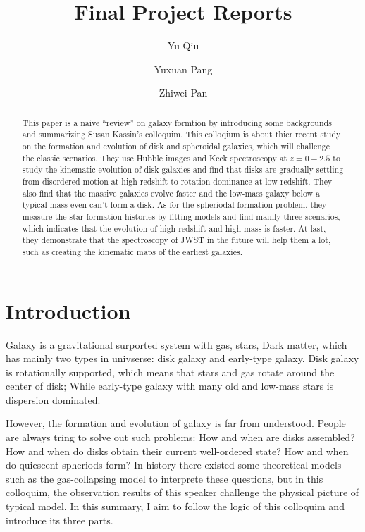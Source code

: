 \documentclass[modern]{aastex63}
\begin{document}
\title{Final Project Reports}
\author{Yu Qiu}
\author{Yuxuan Pang}
\author{Zhiwei Pan}


\begin{abstract}
This paper is a naive “review” on galaxy formtion by introducing some backgrounds and summarizing Susan Kassin's colloquim. This colloqium is about thier recent study on the formation and evolution of disk and spheroidal galaxies, which will challenge the classic scenarios. They use Hubble images and Keck spectroscopy at $z=0-2.5$ to study the kinematic evolution of disk galaxies and find that disks are gradually settling from disordered motion at high redshift to rotation dominance at low redshift. They also find that the massive galaxies evolve faster and the low-mass galaxy below a typical mass even can't form a disk. As for the spheriodal formation problem, they measure the star formation histories by fitting models and find mainly three scenarios, which indicates that the evolution of high redshift and high mass is faster. At last, they demonstrate that the spectroscopy of JWST in the future will help them a lot, such as creating the kinematic maps of the earliest galaxies.


\end{abstract}



\section{Introduction}\label{sec:intro}
Galaxy is a gravitational surported system with gas, stars, Dark matter, which has mainly two types in univserse: disk galaxy and early-type galaxy. Disk galaxy is rotationally supported, which means that stars and gas rotate around the center of disk; While early-type galaxy with many old and low-mass stars is dispersion dominated. 

However, the formation and evolution of galaxy is far from understood. People are always tring to solve out such problems: How and when are disks assembled? How and when do disks obtain their current well-ordered state? How and when do quiescent spheriods form? In history there existed some theoretical models such as the gas-collapsing model to interprete these questions, but in this colloquim, the observation results of this speaker challenge the physical picture of typical model. In this summary, I aim to follow the logic of this colloquim and introduce its three parts.
\end{document}
